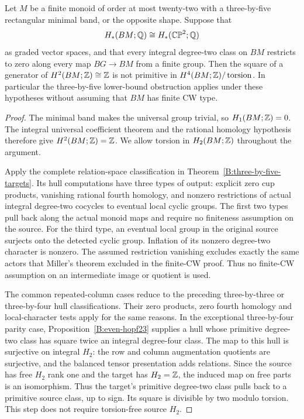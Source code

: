 \begin{proposition}
\label{B:three-by-five-finite-target-transfer}
Let $M$ be a finite monoid of order at most twenty-two with a
three-by-five rectangular minimal band, or the opposite shape.
Suppose that
\[
 H_*(BM;\mathbb Q)\cong H_*(\mathbb {CP}^2;\mathbb Q)
\]
as graded vector spaces, and that every integral degree-two class on
$BM$ restricts to zero along every map $BG\to BM$ from a finite group.
Then the square of a generator of $H^2(BM;\mathbb Z)\cong\mathbb Z$ is not primitive
in $H^4(BM;\mathbb Z)/\operatorname{torsion}$.
In particular the three-by-five lower-bound obstruction applies under
these hypotheses without assuming that $BM$ has finite CW type.
\end{proposition}

\begin{proof}
The minimal band makes the universal group trivial, so $H_1(BM;\mathbb Z)=0$.
The integral universal coefficient theorem and the rational homology
hypothesis therefore give $H^2(BM;\mathbb Z)=\mathbb Z$.  We allow torsion in
$H_2(BM;\mathbb Z)$ throughout the argument.

Apply the complete relation-space classification in
Theorem~\ref{B:three-by-five-targets}.  Its hull computations have three
types of output: explicit zero cup products, vanishing rational fourth
homology, and nonzero restrictions of actual integral degree-two
cocycles to eventual local cyclic groups.  The first two types pull
back along the actual monoid maps and require no finiteness assumption
on the source.  For the third type, an eventual local group in the
original source surjects onto the detected cyclic group.  Inflation of
its nonzero degree-two character is nonzero.  The assumed restriction
vanishing excludes exactly the same actors that Miller's theorem
excluded in the finite-CW proof.  Thus no finite-CW assumption on an
intermediate image or quotient is used.

The common repeated-column cases reduce to the preceding
three-by-three or three-by-four hull classifications.  Their zero
products, zero fourth homology and local-character tests apply for the
same reasons.  In the exceptional three-by-four parity case,
Proposition~\ref{B:even-hopf23} supplies a hull whose primitive
degree-two class has square twice an integral degree-four class.
The map to this hull is surjective on integral $H_2$: the row and
column augmentation quotients are surjective, and the balanced tensor
presentation adds relations.  Since the source has free $H_2$ rank
one and the target has $H_2=\mathbb Z$, the induced map on free parts is an
isomorphism.  Thus the target's primitive degree-two class pulls back
to a primitive source class, up to sign.  Its square is divisible by
two modulo torsion.  This step does not require torsion-free source
$H_2$.


\end{proof}
